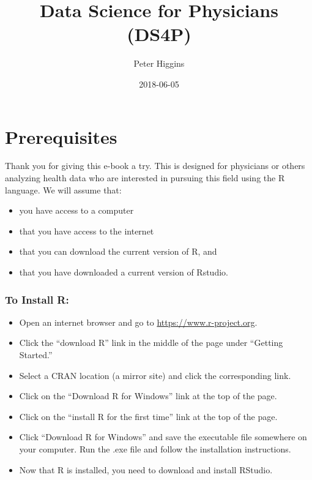 \documentclass[]{book}
\title{Data Science for Physicians (DS4P)}
\author{Peter Higgins}
\date{2018-06-05}
\providecommand{\tightlist}{%
  \setlength{\itemsep}{0pt}\setlength{\parskip}{0pt}}
\theoremstyle{definition}
\theoremstyle{definition}
\theoremstyle{definition}
\theoremstyle{remark}
\begin{document}
\maketitle

{
\setcounter{tocdepth}{1}
\tableofcontents
}
\hypertarget{prerequisites}{%
\chapter{Prerequisites}\label{prerequisites}}

Thank you for giving this e-book a try. This is designed for physicians
or others analyzing health data who are interested in pursuing this
field using the R language. We will assume that:

\begin{itemize}
\tightlist
\item
  you have access to a computer
\item
  that you have access to the internet
\item
  that you can download the current version of R, and
\item
  that you have downloaded a current version of Rstudio. 
\end{itemize}

\hypertarget{to-install-r}{%
\subsection{To Install R:}\label{to-install-r}}

\begin{itemize}
\tightlist
\item
  Open an internet browser and go to \url{https://www.r-project.org}.
\item
  Click the ``download R'' link in the middle of the page under
  ``Getting Started.''
\item
  Select a CRAN location (a mirror site) and click the corresponding
  link.\\
\item
  Click on the ``Download R for Windows'' link at the top of the page.\\
\item
  Click on the ``install R for the first time'' link at the top of the
  page.
\item
  Click ``Download R for Windows'' and save the executable file
  somewhere on your computer. Run the .exe file and follow the
  installation instructions.\\
\item
  Now that R is installed, you need to download and install RStudio. 
\end{itemize}
\end{document}
